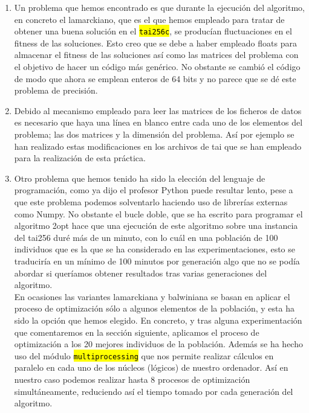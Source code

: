 \documentclass[10pt,a4paper]{article}
\newcommand{\code}[1]{\sethlcolor{light-gray}\hl{\texttt{#1}}} %
\begin{document}
\begin{enumerate}
\item Un problema que hemos encontrado es que durante la ejecución del algoritmo, en concreto el lamarckiano, que es el que hemos empleado para tratar de obtener una buena solución en el \code{tai256c}, se producían fluctuaciones en el fitness de las soluciones. Esto creo que se debe a haber empleado floats para almacenar el fitness de las soluciones así como las matrices del problema con el objetivo de hacer un código más genérico. No obstante se cambió el código de modo que ahora se emplean enteros de 64 bits y no parece que se dé este problema de precisión.

\item Debido al mecanismo empleado para leer las matrices de los ficheros de datos es necesario que haya una línea en blanco entre cada uno de los elementos del problema; las dos matrices y la dimensión del problema. Así por ejemplo se han realizado estas modificaciones en los archivos de tai que se han empleado para la realización de esta práctica.

\item Otro problema que hemos tenido ha sido la elección del lenguaje de programación, como ya dijo el profesor Python puede resultar lento, pese a que este problema podemos solventarlo haciendo uso de librerías externas como Numpy. No obstante el bucle doble, que se ha escrito para programar el algoritmo 2opt hace que una ejecución de este algoritmo sobre una instancia del tai256 duré más de un minuto, con lo cuál en una población de 100 individuos que es la que se ha considerado en las experimentaciones, esto se traduciría en un mínimo de 100 minutos por generación algo que no se podía abordar si queríamos obtener resultados tras varias generaciones del algoritmo.\\

En ocasiones las variantes lamarckiana y balwiniana se basan en aplicar el proceso de optimización sólo a algunos elementos de la población, y esta ha sido la opción que hemos elegido. En concreto, y tras alguna experimentación que comentaremos en la sección siguiente, aplicamos el proceso de optimización a los 20 mejores individuos de la población. Además se ha hecho uso del módulo \code{multiprocessing} que nos permite realizar cálculos en paralelo en cada uno de los núcleos (lógicos) de nuestro ordenador. Así en nuestro caso podemos realizar hasta 8 procesos de optimización simultáneamente, reduciendo así el tiempo tomado por cada generación del algoritmo.


\end{enumerate}
\end{document}
